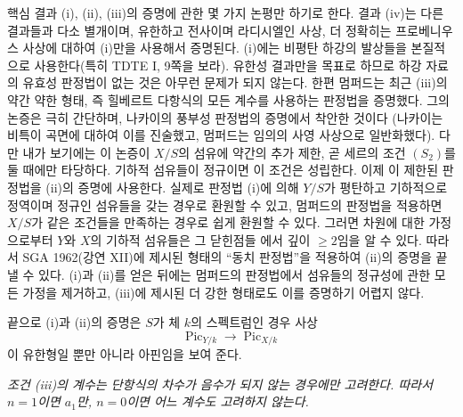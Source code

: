 핵심 결과 (i), (ii), (iii)의 증명에 관한 몇 가지 논평만 하기로 한다.
결과 (iv)는 다른 결과들과 다소 별개이며, 유한하고 전사이며 라디시엘인
사상, 더 정확히는 프로베니우스 사상에 대하여 (i)만을 사용해서 증명된다.
(i)에는 비평탄 하강의 발상들을 본질적으로 사용한다(특히 TDTE I, 9쪽을
보라). 유한성 결과만을 목표로 하므로 하강 자료의 유효성 판정법이 없는
것은 아무런 문제가 되지 않는다. 한편 멈퍼드는 최근 (iii)의 약간 약한
형태, 즉 힐베르트 다항식의 모든 계수를 사용하는 판정법을 증명했다. 그의
논증은 극히 간단하며, 나카이의 풍부성 판정법의 증명에서 착안한 것이다
(나카이는 비특이 곡면에 대하여 이를 진술했고, 멈퍼드는 임의의 사영
사상으로 일반화했다). 다만 내가 보기에는 이 논증이 $X/S$의 섬유에
약간의 추가 제한, 곧 세르의 조건 $(S_2)$를 둘 때에만 타당하다. 기하적
섬유들이 정규이면 이 조건은 성립한다. 이제 이 제한된 판정법을 (ii)의
증명에 사용한다. 실제로 판정법 (i)에 의해 $Y/S$가 평탄하고 기하적으로
정역이며 정규인 섬유들을 갖는 경우로 환원할 수 있고, 멈퍼드의 판정법을
적용하면 $X/S$가 같은 조건들을 만족하는 경우로 쉽게 환원할 수 있다.
그러면 차원에 대한 가정으로부터 $Y$와 $X$의 기하적 섬유들은 그 닫힌점들
에서 깊이 $\geq2$임을 알 수 있다. 따라서 SGA 1962(강연 XII)에 제시된
형태의 ``동치 판정법''을 적용하여 (ii)의 증명을 끝낼 수 있다. (i)과
(ii)를 얻은 뒤에는 멈퍼드의 판정법에서 섬유들의 정규성에 관한 모든
가정을 제거하고, (iii)에 제시된 더 강한 형태로도 이를 증명하기 어렵지
않다.

끝으로 (i)과 (ii)의 증명은 $S$가 체 $k$의 스펙트럼인 경우 사상
\[
\operatorname{Pic}_{Y/k}\longrightarrow\operatorname{Pic}_{X/k}
\]
이 유한형일 뿐만 아니라 아핀임을 보여 준다.

\par\smallskip
\begingroup\footnotesize
\noindent\textit{조건 (iii)의 계수는 단항식의 차수가 음수가 되지 않는 경우에만 고려한다. 따라서 $n=1$이면 $a_1$만, $n=0$이면 어느 계수도 고려하지 않는다.}\par
\endgroup
